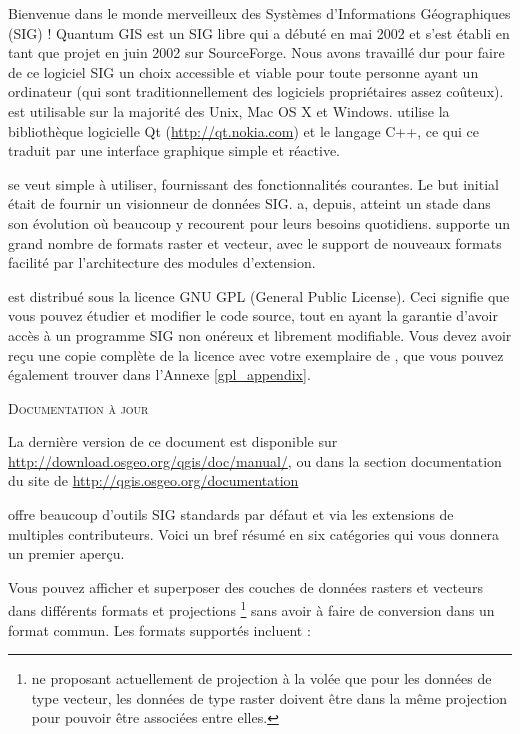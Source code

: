 \mainmatter
\pagestyle{scrheadings}
\label{label_forward}

Bienvenue dans le monde merveilleux des Systèmes d'Informations Géographiques 
(SIG) ! Quantum GIS est un SIG libre qui a débuté en mai 2002 et s'est établi en 
tant que projet en juin 2002 sur SourceForge. Nous avons travaillé dur pour faire 
de ce logiciel SIG un choix accessible et viable pour toute personne ayant un 
ordinateur  (qui sont traditionnellement des logiciels propriétaires assez 
coûteux). \qg est utilisable sur la majorité des Unix, Mac OS X et Windows. 
\qg utilise la bibliothèque logicielle Qt (\url{http://qt.nokia.com}) et le 
langage C++, ce qui ce traduit par une interface graphique simple et réactive.

\qg se veut simple à utiliser, fournissant des fonctionnalités courantes. Le but 
initial était de fournir un visionneur de données SIG. \qg a, depuis, atteint un 
stade dans son évolution où beaucoup y recourent pour leurs besoins quotidiens. 
\qg supporte un grand nombre de formats raster et vecteur, avec le support de 
nouveaux formats facilité par l'architecture des modules d'extension.

\qg est distribué sous la licence GNU GPL (General Public License). Ceci signifie 
que vous pouvez étudier et modifier le code source, tout en ayant la garantie 
d'avoir accès à un programme SIG non onéreux et librement modifiable. Vous devez 
avoir reçu une copie complète de la licence avec votre exemplaire de \qg, que 
vous pouvez également trouver dans l'Annexe \ref{gpl_appendix}.

\begin{Tip}\caption{\textsc{Documentation à jour}}
La dernière version de ce document est disponible sur 
\url{http://download.osgeo.org/qgis/doc/manual/}, ou dans la section 
documentation du site de \qg \url{http://qgis.osgeo.org/documentation}
\end{Tip}

\label{label_majfeat}

\qg offre beaucoup d'outils SIG standards par défaut et via les extensions de 
multiples contributeurs. Voici un bref résumé en six catégories qui vous donnera 
un premier aperçu.


Vous pouvez afficher et superposer des couches de données rasters et vecteurs 
dans différents formats et projections \footnote{\qg ne proposant actuellement 
de projection à la volée que pour les données de type vecteur, les données de 
type raster doivent être dans la même projection pour pouvoir être associées 
entre elles.} sans avoir à faire de conversion dans un format commun. Les 
formats supportés incluent :

